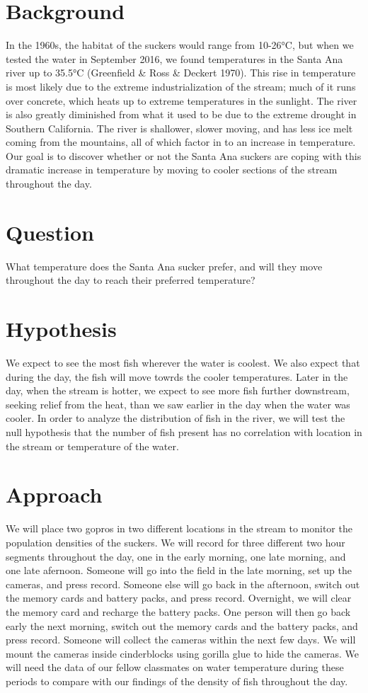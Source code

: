 \documentclass{tufte-handout}
\begin{document}
\section{Background}  In the 1960s, the habitat of the suckers would range from 10-26°C, but when we tested the water in September 2016, we found temperatures in the Santa Ana river up to 35.5°C (Greenfield & Ross & Deckert 1970).  This rise in temperature is most likely due to the extreme industrialization of the stream; much of it runs over concrete, which heats up to extreme temperatures in the sunlight.  The river is also greatly diminished from what it used to be due to the extreme drought in Southern California.  The river is shallower, slower moving, and has less ice melt coming from the mountains, all of which factor in to an increase in temperature.  Our goal is to discover whether or not the Santa Ana suckers are coping with this dramatic increase in temperature by moving to cooler sections of the stream throughout the day.  

\section{Question} What temperature does the Santa Ana sucker prefer, and will they move throughout the day to reach their preferred temperature?

\section{Hypothesis} We expect to see the most fish wherever the water is coolest.  We also expect that during the day, the fish will move towrds the cooler temperatures.  Later in the day, when the stream is hotter, we expect to see more fish further downstream, seeking relief from the heat, than we saw earlier in the day when the water was cooler.  In order to analyze the distribution of fish in the river, we will test the null hypothesis that the number of fish present has no correlation with location in the stream or temperature of the water.

\section{Approach} We will place two gopros in two different locations in the stream to monitor the population densities of the suckers. We will record for three different two hour segments throughout the day, one in the early morning, one late morning, and one late afernoon.  Someone will go into the field in the late morning, set up the cameras, and press record.  Someone else will go back in the afternoon, switch out the memory cards and battery packs, and press record. Overnight, we will clear the memory card and recharge the battery packs.  One person will then go back early the next morning, switch out the memory cards and the battery packs, and press record.  Someone will collect the cameras within the next few days.  We will mount the cameras inside cinderblocks using gorilla glue to hide the cameras. We will need the data of our fellow classmates on water temperature during these periods to compare with our findings of the density of fish throughout the day.
\end{document}
